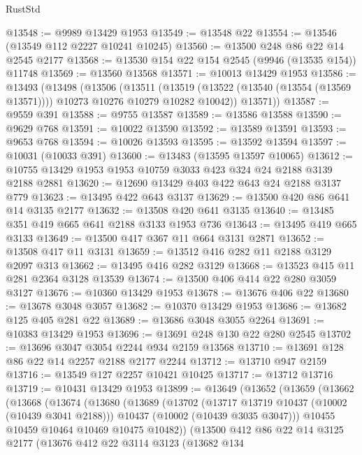 \begin{lexlean}{RustStd}
\begin{coremodule}
@13548 := @9989 @13429 @1953
@13549 := @13548 @22
@13554 := @13546 (@13549 @112 @2227 @10241 @10245)
@13560 := @13500 @248 @86 @22 @14 @2545 @2177
@13568 := @13530 @154 @22 @154 @2545 (@9946 (@13535 @154)) @11748
@13569 := @13560 @13568
@13571 := @10013 @13429 @1953
@13586 := @13493
    (@13498
      (@13506
        (@13511
          (@13519 (@13522 (@13540 (@13554 (@13569 @13571)))) @10273 @10276 @10279 @10282 @10042))
        @13571))
@13587 := @9559 @391
@13588 := @9755 @13587
@13589 := @13586 @13588
@13590 := @9629 @768
@13591 := @10022 @13590
@13592 := @13589 @13591
@13593 := @9653 @768
@13594 := @10026 @13593
@13595 := @13592 @13594
@13597 := @10031 (@10033 @391)
@13600 := @13483 (@13595 @13597 @10065)
@13612 := @10755 @13429 @1953 @1953 @10759 @3033 @423 @324 @24 @2188 @3139 @2188 @2881
@13620 := @12690 @13429 @403 @422 @643 @24 @2188 @3137 @779
@13623 := @13495 @422 @643 @3137
@13629 := @13500 @420 @86 @641 @14 @3135 @2177
@13632 := @13508 @420 @641 @3135
@13640 := @13485 @351 @419 @665 @641 @2188 @3133 @1953 @736
@13643 := @13495 @419 @665 @3133
@13649 := @13500 @417 @367 @11 @664 @3131 @2871
@13652 := @13508 @417 @11 @3131
@13659 := @13512 @416 @282 @11 @2188 @3129 @2097 @313
@13662 := @13495 @416 @282 @3129
@13668 := @13523 @415 @11 @281 @2364 @3128 @13539
@13674 := @13500 @406 @414 @22 @280 @3059 @3127
@13676 := @10360 @13429 @1953
@13678 := @13676 @406 @22
@13680 := @13678 @3048 @3057
@13682 := @10370 @13429 @1953
@13686 := @13682 @125 @405 @281 @22
@13689 := @13686 @3048 @3055 @2264
@13691 := @10383 @13429 @1953
@13696 := @13691 @248 @130 @22 @280 @2545
@13702 := @13696 @3047 @3054 @2244 @934 @2159 @13568
@13710 := @13691 @128 @86 @22 @14 @2257 @2188 @2177 @2244
@13712 := @13710 @947 @2159
@13716 := @13549 @127 @2257 @10421 @10425
@13717 := @13712 @13716
@13719 := @10431 @13429 @1953
@13899 := @13649
    (@13652
      (@13659
        (@13662
          (@13668
            (@13674
              (@13680
                (@13689
                  (@13702
                    (@13717 @13719 @10437 (@10002 (@10439 @3041 @2188)))
                    @10437
                    (@10002 (@10439 @3035 @3047)))
                  @10455
                  @10459
                  @10464
                  @10469
                  @10475
                  @10482))
              (@13500
                @412
                @86
                @22
                @14
                @3125
                @2177
                (@13676
                  @412
                  @22
                  @3114
                  @3123
                  (@13682
                    @134

\end{coremodule}
\end{lexlean}
